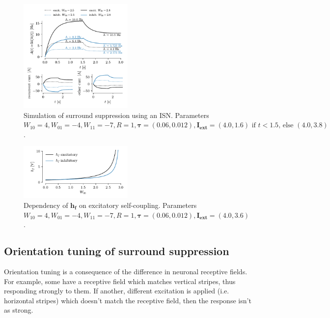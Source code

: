 \documentclass[10pt,conference,compsocconf,a4paper]{IEEEtran}
\renewcommand{\vec}[1]{\boldsymbol{#1}}
\begin{document}
		\begin{figure}
			\centering
			\includegraphics[width=0.5\textwidth]{figures/pop_surround.pdf}
			\caption{Simulation of surround suppression using an ISN. Parameters $W_{10} = 4, W_{01} = -4, W_{11} = -7, R = 1, \vec \tau = (0.06, 0.012), \vec{I_{\text{ext}}} = (4.0, 1.6) \text{ if $t < 1.5$, else } (4.0, 3.8)$.}
			\label{figure:pop_surroud}
		\end{figure}

		\begin{figure}
			\centering
			\includegraphics[width=0.5\textwidth]{figures/pop_surround_hf_W00.pdf}
			\caption{Dependency of $\vec{h_f}$ on excitatory self-coupling. Parameters $W_{10} = 4, W_{01} = -4, W_{11} = -7, R = 1, \vec \tau = (0.06, 0.012), \vec{I_{\text{ext}}} = (4.0, 3.6)$.}
			\label{figure:pop_surroud_hf_W00}
		\end{figure}

	\subsection{Orientation tuning of surround suppression}
	\label{sec22}

		Orientation tuning is a consequence of the difference in neuronal receptive fields. For example, some have a receptive field which matches vertical stripes, thus responding strongly to them. If another, different excitation is applied (i.e. horizontal stripes) which doesn't match the receptive field, then the response isn't as strong.
		
\end{document}
